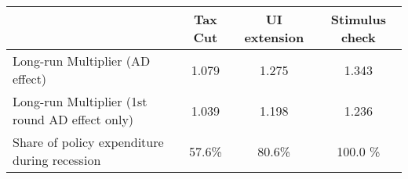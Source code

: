 \begin{tabular}{@{}lccc@{}} 
\toprule 
& Tax Cut    & UI extension    & Stimulus check    \\  \midrule 
Long-run Multiplier (AD effect) &1.079  & 1.275  & 1.343     \\ 
Long-run Multiplier (1st round AD effect only) &1.039  & 1.198  & 1.236     \\
Share of policy expenditure during recession &57.6\%  & 80.6\%  & 100.0 \%    \\ 
\end{tabular}  
